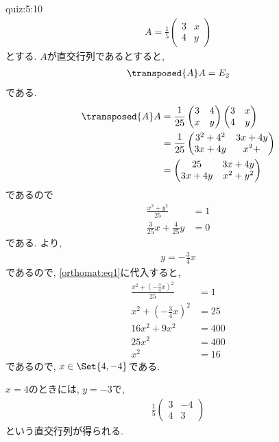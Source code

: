 \begin{answerof}{quiz:5:10}
  \begin{align*}
    A=\frac{1}{5}\begin{pmatrix}3&x\\4&y\end{pmatrix}
  \end{align*}
  とする.
  $A$が直交行列であるとすると,
  \begin{align*}
    \transposed{A}A=E_2
  \end{align*}
  である.
  \begin{align*}
    \transposed{A}A
    &=\frac{1}{25}\begin{pmatrix}3&4\\x&y\end{pmatrix}\begin{pmatrix}3&x\\4&y\end{pmatrix}\\
    &=\frac{1}{25}\begin{pmatrix}3^2+4^2&3x+4y\\3x+4y&x^2+\end{pmatrix}\\
    &=\begin{pmatrix}25&3x+4y\\3x+4y&x^2+y^2\end{pmatrix}
  \end{align*}
  であるので
  \begin{align}
    \frac{x^2+y^2}{25}&=1\label{orthomat:eq1}\\
    \frac{3}{25}x+\frac{4}{25}y&=0
    \label{orthomat:eq2}
  \end{align}
  である.
  より, 
  \begin{align*}
    y=-\frac{3}{4}x
  \end{align*}
  であるので, \cref{orthomat:eq1}に代入すると,
  \begin{align*}
    \frac{x^2+\left(-\frac{3}{4}x\right)^2}{25}&=1\\
    x^2+\left(-\frac{3}{4}x\right)^2&=25\\
    16x^2+9x^2&=400\\
    25x^2&=400\\
    x^2&=16
  \end{align*}
  であるので, $x\in\Set{4,-4}$である.

  $x=4$のときには,
  $y=-3$で,
  \begin{align*}
    \frac{1}{5}\begin{pmatrix}3&-4\\4&3\end{pmatrix}
  \end{align*}
  という直交行列が得られる.


\end{answerof}
